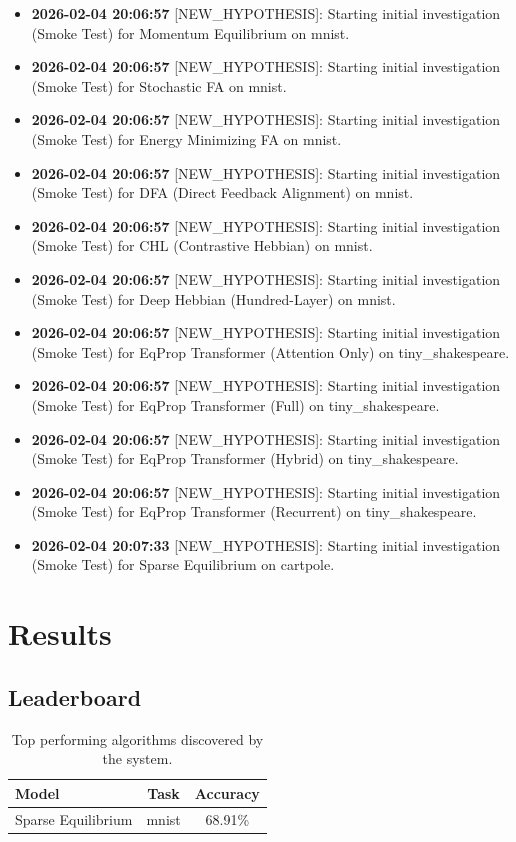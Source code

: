 \documentclass{article}
\begin{document}
\begin{itemize}
\item \textbf{2026-02-04 20:06:57} [NEW_HYPOTHESIS]: Starting initial investigation (Smoke Test) for Momentum Equilibrium on mnist.
\item \textbf{2026-02-04 20:06:57} [NEW_HYPOTHESIS]: Starting initial investigation (Smoke Test) for Stochastic FA on mnist.
\item \textbf{2026-02-04 20:06:57} [NEW_HYPOTHESIS]: Starting initial investigation (Smoke Test) for Energy Minimizing FA on mnist.
\item \textbf{2026-02-04 20:06:57} [NEW_HYPOTHESIS]: Starting initial investigation (Smoke Test) for DFA (Direct Feedback Alignment) on mnist.
\item \textbf{2026-02-04 20:06:57} [NEW_HYPOTHESIS]: Starting initial investigation (Smoke Test) for CHL (Contrastive Hebbian) on mnist.
\item \textbf{2026-02-04 20:06:57} [NEW_HYPOTHESIS]: Starting initial investigation (Smoke Test) for Deep Hebbian (Hundred-Layer) on mnist.
\item \textbf{2026-02-04 20:06:57} [NEW_HYPOTHESIS]: Starting initial investigation (Smoke Test) for EqProp Transformer (Attention Only) on tiny\_shakespeare.
\item \textbf{2026-02-04 20:06:57} [NEW_HYPOTHESIS]: Starting initial investigation (Smoke Test) for EqProp Transformer (Full) on tiny\_shakespeare.
\item \textbf{2026-02-04 20:06:57} [NEW_HYPOTHESIS]: Starting initial investigation (Smoke Test) for EqProp Transformer (Hybrid) on tiny\_shakespeare.
\item \textbf{2026-02-04 20:06:57} [NEW_HYPOTHESIS]: Starting initial investigation (Smoke Test) for EqProp Transformer (Recurrent) on tiny\_shakespeare.
\item \textbf{2026-02-04 20:07:33} [NEW_HYPOTHESIS]: Starting initial investigation (Smoke Test) for Sparse Equilibrium on cartpole.
\end{itemize}
\section{Results}
\subsection{Leaderboard}
\begin{table}[h]
\centering
\begin{tabular}{l c c}
\toprule
Model & Task & Accuracy \\
\midrule
Sparse Equilibrium & mnist & 68.91\% \\
\bottomrule
\end{tabular}
\caption{Top performing algorithms discovered by the system.}
\end{table}
\end{document}
